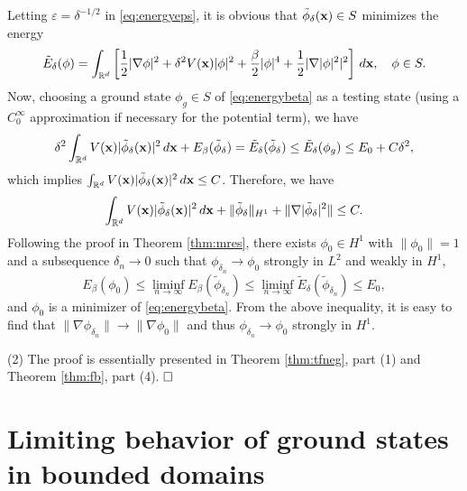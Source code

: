 \documentclass{elsarticle}
\newcommand{\vep}{\varepsilon}
\newcommand{\bx}{{\bf x} }
\begin{document}
Letting $\vep=\delta^{-1/2}$ in \eqref{eq:energyeps}, it is obvious that $\tilde{\phi}_\delta(\bx)\in S$ minimizes the energy
\begin{equation}
\tilde{E}_{\delta}(\phi)=\int_{\Bbb R^d}\left[\frac{1}{2}|\nabla\phi|^2+\delta^2V(\bx)|\phi|^2+\frac{\beta}{2}|\phi|^4+\frac{1}{2}|\nabla|\phi|^2|^2\right]\,d\bx,\quad \phi\in S.
\end{equation}
Now, choosing a ground state $\phi_g\in S$ of \eqref{eq:energybeta} as a testing state (using a $C_0^\infty$ approximation if necessary for the potential term), we have
\begin{equation*}
\delta^2\int_{\Bbb R^d}V(\bx)|\tilde{\phi}_\delta(\bx)|^2\,d\bx+E_\beta(\tilde{\phi}_\delta)=\tilde{E}_{\delta}(\tilde{\phi}_\delta)\leq \tilde{E}_{\delta}(\phi_g)
\leq E_0+C\delta^2,
\end{equation*}
which implies $\int_{\Bbb R^d}V(\bx)|\tilde{\phi}_\delta(\bx)|^2\,d\bx\leq C$. Therefore, we have
\begin{equation*}
\int_{\Bbb R^d}V(\bx)|\tilde{\phi}_\delta(\bx)|^2\,d\bx+\|\tilde{\phi}_\delta\|_{H^1}+\|\nabla|\tilde{\phi}_\delta|^2\|\leq C.
\end{equation*}
Following the proof in Theorem \ref{thm:mres}, there exists $\phi_0\in H^1$ with $\|\phi_0\|=1$ and a subsequence $\delta_n\to0$ such that
$\phi_{\delta_n}\to\phi_0$ strongly in $L^2$ and weakly in $H^1$,
\begin{equation*}
E_{\beta}(\phi_0)\leq \liminf_{n\to\infty}E_{\beta}(\tilde{\phi}_{\delta_n})\leq\liminf_{n\to\infty}\tilde{E}_{\delta}(\tilde{\phi}_{\delta_n})
\leq E_0,
\end{equation*}
and $\phi_0$ is a minimizer of \eqref{eq:energybeta}. From the above inequality, it is easy to find that $\|\nabla\phi_{\delta_n}\|\to\|\nabla\phi_0\|$
 and thus $\phi_{\delta_n}\to\phi_0$ strongly in $H^1$.


(2) The proof is essentially presented in Theorem \ref{thm:tfneg}, part (1) and Theorem \ref{thm:fb}, part (4). $\hfill\Box$


\section{Limiting behavior of ground states in  bounded domains}\label{subsec:bd}
\end{document}
